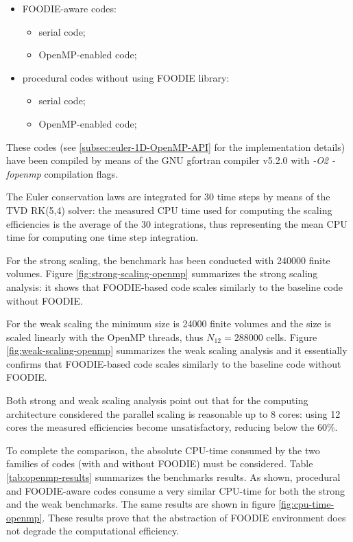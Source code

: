 \begin{itemize}
  \item FOODIE-aware codes:
    \begin{itemize}
      \item serial code;
      \item OpenMP-enabled code;
      \end{itemize}
  \item procedural codes without using FOODIE library:
    \begin{itemize}
      \item serial code;
      \item OpenMP-enabled code;
      \end{itemize}
  \end{itemize}

These codes (see \ref{subsec:euler-1D-OpenMP-API} for the implementation details) have been compiled by means of the GNU gfortran compiler v5.2.0 with \emph{-O2 -fopenmp} compilation flags.

The Euler conservation laws are integrated for 30 time steps by means of the TVD RK(5,4) solver: the measured CPU time used for computing the scaling efficiencies is the average of the 30 integrations, thus representing the mean CPU time for computing one time step integration.

For the strong scaling, the benchmark has been conducted with 240000 finite volumes. Figure \ref{fig:strong-scaling-openmp} summarizes the strong scaling analysis: it shows that FOODIE-based code scales similarly to the baseline code without FOODIE.

For the weak scaling the minimum size is 24000 finite volumes and the size is scaled linearly with the OpenMP threads, thus $N_{12} = 288000$ cells. Figure \ref{fig:weak-scaling-openmp} summarizes the weak scaling analysis and it essentially confirms that FOODIE-based code scales similarly to the baseline code without FOODIE.

Both strong and weak scaling analysis point out that for the computing architecture considered the parallel scaling is reasonable up to 8 cores: using 12 cores the measured efficiencies become unsatisfactory, reducing below the 60\%.

To complete the comparison, the absolute CPU-time consumed by the two families of codes (with and without FOODIE) must be considered. Table \ref{tab:openmp-results} summarizes the benchmarks results. As shown, procedural and FOODIE-aware codes consume a very similar CPU-time for both the strong and the weak benchmarks. The same results are shown in figure \ref{fig:cpu-time-openmp}. These results prove that the abstraction of FOODIE environment does not degrade the computational efficiency.

